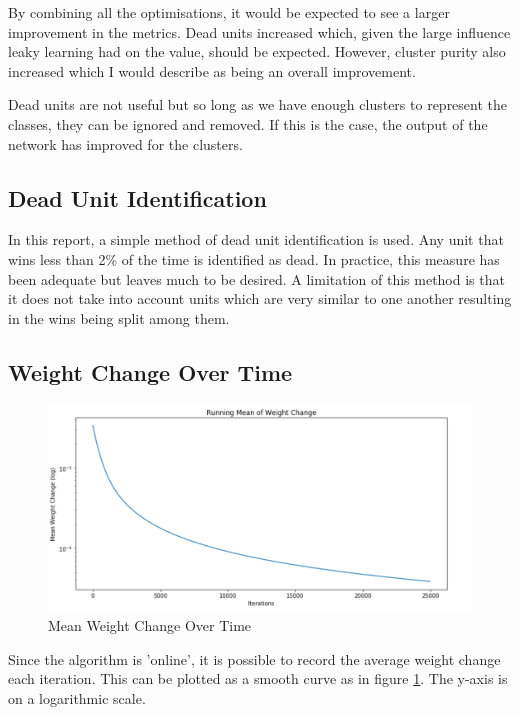 \documentclass[11pt,journal,transmag,final]{IEEEtran}
\begin{document}
By combining all the optimisations, it would be expected to see a larger improvement in the metrics. Dead units increased which, given the large influence leaky learning had on the value, should be expected. However, cluster purity also increased which I would describe as being an overall improvement.

Dead units are not useful but so long as we have enough clusters to represent the classes, they can be ignored and removed. If this is the case, the output of the network has improved for the clusters.

\subsection{Dead Unit Identification}
\label{section:nn:dead-unit-identification}

In this report, a simple method of dead unit identification is used. Any unit that wins less than 2\% of the time is identified as dead. In practice, this measure has been adequate but leaves much to be desired. A limitation of this method is that it does not take into account units which are very similar to one another resulting in the wins being split among them.

\subsection{Weight Change Over Time}

\begin{figure}[b]
    \begin{center}
        \includegraphics[width=\linewidth,keepaspectratio]{figures/nn-weight-change.png}
        \caption{Mean Weight Change Over Time}
        \label{fig:nn-mean-weight-change}
    \end{center}
\end{figure}

Since the algorithm is 'online', it is possible to record the average weight change each iteration. This can be plotted as a smooth curve as in figure \ref{fig:nn-mean-weight-change}. The y-axis is on a logarithmic scale.
\end{document}
